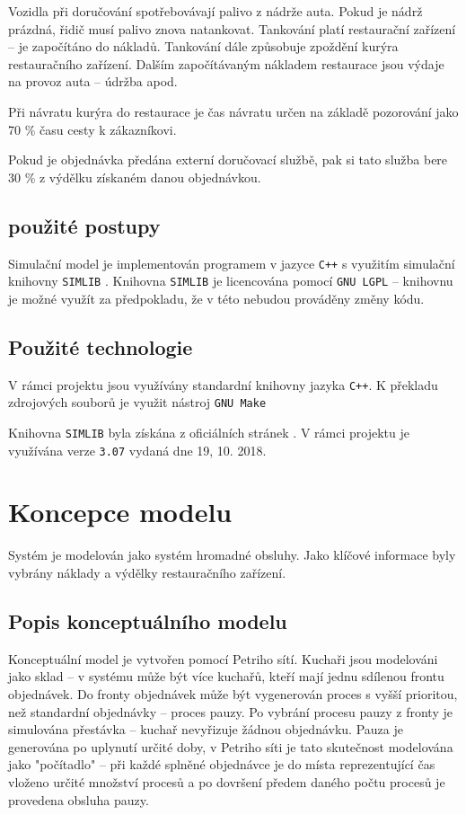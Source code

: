 \documentclass[a4paper, 11pt]{article}
\begin{document}
Vozidla při doručování spotřebovávají palivo z nádrže auta. Pokud je nádrž prázdná, řidič musí palivo znova natankovat. Tankování platí restaurační zařízení -- je započítáno do nákladů. Tankování dále způsobuje zpoždění kurýra restauračního zařízení. Dalším započítávaným nákladem restaurace jsou výdaje na provoz auta -- údržba apod. 

Při návratu kurýra do restaurace je čas návratu určen na základě pozorování jako 70 \% času cesty k zákazníkovi. 

Pokud je objednávka předána externí doručovací službě, pak si tato služba bere 30 \% z výdělku \cite{news} získaném danou objednávkou. 

\subsection{použité postupy}
Simulační model \cite[snímek 9]{IMS_course} je implementován programem v jazyce \texttt{C++} s využitím simulační knihovny \texttt{SIMLIB} \cite{SIMLIB}.
Knihovna \texttt{SIMLIB} je licencována pomocí \texttt{GNU LGPL} -- knihovnu je možné využít za předpokladu, že v této nebudou prováděny změny kódu. 

\subsection{Použité technologie}
V rámci projektu jsou využívány standardní knihovny jazyka \texttt{C++}. K překladu zdrojových souborů je využit nástroj \texttt{GNU Make}

Knihovna \texttt{SIMLIB} byla získána z oficiálních stránek \cite{SIMLIB}. V rámci projektu je využívána verze \texttt{3.07} vydaná dne 19, 10. 2018.

\section{Koncepce modelu}
Systém je modelován jako systém hromadné obsluhy. Jako klíčové informace byly vybrány náklady a výdělky restauračního zařízení. 

\subsection{Popis konceptuálního modelu}
Konceptuální model je vytvořen pomocí Petriho sítí. Kuchaři jsou modelováni jako sklad -- v systému může být více kuchařů, kteří mají jednu sdílenou frontu objednávek. Do fronty objednávek může být vygenerován proces s vyšší prioritou, než standardní objednávky -- proces pauzy. Po vybrání procesu pauzy z fronty je simulována přestávka -- kuchař nevyřizuje žádnou objednávku. Pauza je generována po uplynutí určité doby, v Petriho síti je tato skutečnost modelována jako "počítadlo" -- při každé splněné objednávce je do místa reprezentující čas vloženo určité množství procesů a po dovršení předem daného počtu procesů je provedena obsluha pauzy.
\end{document}
